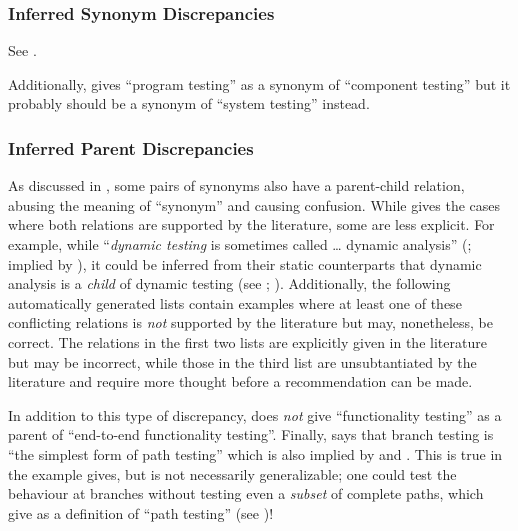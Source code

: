     \subsubsection{Inferred Synonym Discrepancies}
    See .

    \begin{enumerate}
        
    \end{enumerate}

    Additionally, \citet[p.~46]{Kam2008} gives ``program testing'' as a synonym
    of ``component testing'' but it probably should be a synonym of ``system
    testing'' instead.

    \subsubsection{Inferred Parent Discrepancies}
    \label{infParSyns}
    As discussed in , some pairs of synonyms also have a
    parent-child relation, abusing the meaning of ``synonym'' and causing
    confusion. While  gives the cases where both relations
    are supported by the literature, some are less explicit. For example, while
    ``\emph{dynamic testing} is sometimes called \dots{} dynamic analysis''
    (\citealp[p.~438]{PetersAndPedrycz2000}; implied by \citealp[p.~149]{IEEE2017}),
    it could be inferred from their static counterparts that dynamic analysis
    is a \emph{child} of dynamic testing (see
    \citealp[pp.~9, 17, 25, 28]{IEEE2022}; \citealpISTQB{}). Additionally, the
    following automatically generated lists contain examples where at least
    one of these conflicting relations is \emph{not} supported by the
    literature but may, nonetheless, be correct. The relations in the first two
    lists are explicitly given in the literature but may be incorrect, while
    those in the third list are unsubtantiated by the literature and require
    more thought before a recommendation can be made.

    

    In addition to this type of discrepancy, \citep[Tab.~2]{Gerrard2000a} does
    \emph{not} give ``functionality testing'' as a parent of ``end-to-end
    functionality testing''. Finally, \citet[p.~119]{Patton2006} says that
    branch testing is ``the simplest form of path testing'' which is also
    implied by \citet[Fig.~F.1]{IEEE2021} and
    \citet[p.~433]{vanVliet2000}. This is true in the example
    \citeauthor{Patton2006} gives, but is not necessarily generalizable; one
    could test the behaviour at branches without testing even a \emph{subset}
    of complete paths, which \citet[p.~316]{IEEE2017} give as a definition of
    ``path testing'' (see )!

